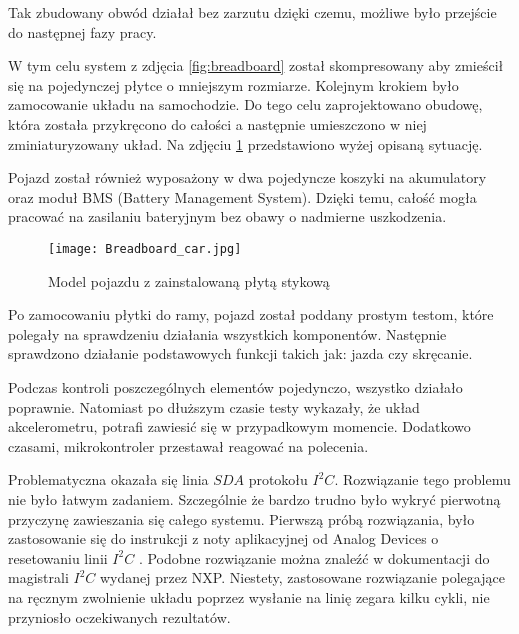         Tak zbudowany obwód działał bez zarzutu dzięki czemu, możliwe było przejście do następnej fazy pracy.

        W tym celu system z zdjęcia \ref{fig:breadboard} został skompresowany aby zmieścił się na pojedynczej płytce o mniejszym rozmiarze.
        Kolejnym krokiem było zamocowanie układu na samochodzie.
        Do tego celu zaprojektowano obudowę, która została przykręcono do całości a następnie umieszczono w niej zminiaturyzowany układ.
        Na zdjęciu \ref{fig:breadboard_car} przedstawiono wyżej opisaną sytuację.

        Pojazd został również wyposażony w dwa pojedyncze koszyki na akumulatory oraz moduł BMS (Battery Management System).
        Dzięki temu, całość mogła pracować na zasilaniu bateryjnym bez obawy o nadmierne uszkodzenia.

        \begin{figure}[!ht]
            \centering
            \texttt{[image: Breadboard\_car.jpg]}
            \caption{Model pojazdu z zainstalowaną płytą stykową}
            \label{fig:breadboard_car}
        \end{figure}

        Po zamocowaniu płytki do ramy, pojazd został poddany prostym testom, które polegały na sprawdzeniu działania wszystkich komponentów.
        Następnie sprawdzono działanie podstawowych funkcji takich jak: jazda czy skręcanie.

        Podczas kontroli poszczególnych elementów pojedynczo, wszystko działało poprawnie.
        Natomiast po dłuższym czasie testy wykazały, że układ akcelerometru, potrafi zawiesić się w przypadkowym momencie.
        Dodatkowo czasami, mikrokontroler przestawał reagować na polecenia.

        Problematyczna okazała się linia $SDA$ protokołu $I^2C$.
        Rozwiązanie tego problemu nie było łatwym zadaniem.
        Szczególnie że bardzo trudno było wykryć pierwotną przyczynę zawieszania się całego systemu.
        Pierwszą próbą rozwiązania, było zastosowanie się do instrukcji z noty aplikacyjnej od Analog Devices o resetowaniu linii $I^2C$ \cite{application_note_I2C_AD}.
        Podobne rozwiązanie można znaleźć w dokumentacji do magistrali $I^2C$ \cite{I2C_manual_NXP} wydanej przez NXP.
        Niestety, zastosowane rozwiązanie polegające na ręcznym zwolnienie układu poprzez wysłanie na linię zegara kilku cykli, nie przyniosło oczekiwanych rezultatów.

